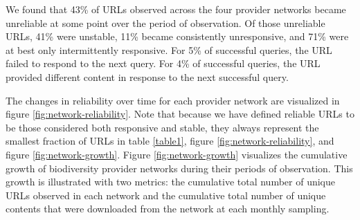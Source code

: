 We found that 43\% of URLs observed across the four provider networks became unreliable at some point over the period of observation. Of those unreliable URLs, 41\% were unstable, 11\% became consistently unresponsive, and 71\% were at best only intermittently responsive. For 5\% of successful queries, the URL failed to respond to the next query. For 4\% of successful queries, the URL provided different content in response to the next successful query.

The changes in reliability over time for each provider network are visualized in figure \ref{fig:network-reliability}. Note that because we have defined reliable URLs to be those considered both responsive and stable, they always represent the smallest fraction of URLs in table \ref{table1}, figure \ref{fig:network-reliability}, and figure \ref{fig:network-growth}. Figure \ref{fig:network-growth} visualizes the cumulative growth of biodiversity provider networks during their periods of observation. This growth is illustrated with two metrics: the cumulative total number of unique URLs observed in each network and the cumulative total number of unique contents that were downloaded from the network at each monthly sampling.









